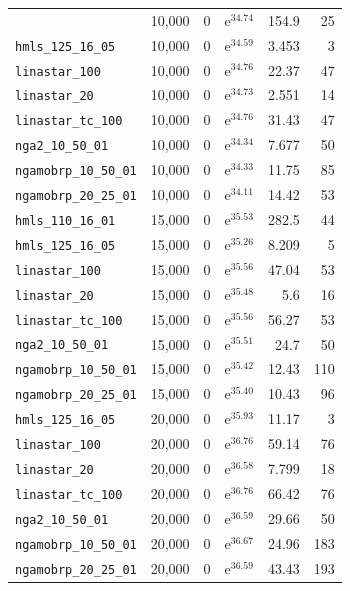 \begin{longtable}{|l|r|r|r|r|r|}
{    \texttt{hmls\_110\_16\_01} & 10,000 & 0 & $\mathrm{e}^{34.74}$ & 154.9 & 25 \\
    \texttt{hmls\_125\_16\_05} & 10,000 & 0 & $\mathrm{e}^{34.59}$ & 3.453 & 3 \\
    \texttt{linastar\_100} & 10,000 & 0 & $\mathrm{e}^{34.76}$ & 22.37 & 47 \\
    \texttt{linastar\_20} & 10,000 & 0 & $\mathrm{e}^{34.73}$ & 2.551 & 14 \\
    \texttt{linastar\_tc\_100} & 10,000 & 0 & $\mathrm{e}^{34.76}$ & 31.43 & 47 \\
    \texttt{nga2\_10\_50\_01} & 10,000 & 0 & $\mathrm{e}^{34.34}$ & 7.677 & 50 \\
    \texttt{ngamobrp\_10\_50\_01} & 10,000 & 0 & $\mathrm{e}^{34.33}$ & 11.75 & 85 \\
    \texttt{ngamobrp\_20\_25\_01} & 10,000 & 0 & $\mathrm{e}^{34.11}$ & 14.42 & 53 \\
    \texttt{hmls\_110\_16\_01} & 15,000 & 0 & $\mathrm{e}^{35.53}$ & 282.5 & 44 \\
    \texttt{hmls\_125\_16\_05} & 15,000 & 0 & $\mathrm{e}^{35.26}$ & 8.209 & 5 \\
    \texttt{linastar\_100} & 15,000 & 0 & $\mathrm{e}^{35.56}$ & 47.04 & 53 \\
    \texttt{linastar\_20} & 15,000 & 0 & $\mathrm{e}^{35.48}$ & 5.6 & 16 \\
    \texttt{linastar\_tc\_100} & 15,000 & 0 & $\mathrm{e}^{35.56}$ & 56.27 & 53 \\
    \texttt{nga2\_10\_50\_01} & 15,000 & 0 & $\mathrm{e}^{35.51}$ & 24.7 & 50 \\
    \texttt{ngamobrp\_10\_50\_01} & 15,000 & 0 & $\mathrm{e}^{35.42}$ & 12.43 & 110 \\
    \texttt{ngamobrp\_20\_25\_01} & 15,000 & 0 & $\mathrm{e}^{35.40}$ & 10.43 & 96 \\
    \texttt{hmls\_125\_16\_05} & 20,000 & 0 & $\mathrm{e}^{35.93}$ & 11.17 & 3 \\
    \texttt{linastar\_100} & 20,000 & 0 & $\mathrm{e}^{36.76}$ & 59.14 & 76 \\
    \texttt{linastar\_20} & 20,000 & 0 & $\mathrm{e}^{36.58}$ & 7.799 & 18 \\
    \texttt{linastar\_tc\_100} & 20,000 & 0 & $\mathrm{e}^{36.76}$ & 66.42 & 76 \\
    \texttt{nga2\_10\_50\_01} & 20,000 & 0 & $\mathrm{e}^{36.59}$ & 29.66 & 50 \\
    \texttt{ngamobrp\_10\_50\_01} & 20,000 & 0 & $\mathrm{e}^{36.67}$ & 24.96 & 183 \\
    \texttt{ngamobrp\_20\_25\_01} & 20,000 & 0 & $\mathrm{e}^{36.59}$ & 43.43 & 193 \\
\end{longtable}
